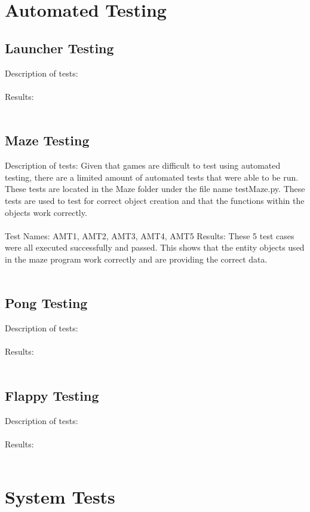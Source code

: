 \documentclass[12pt, titlepage]{article}
\begin{document}
\section{Automated Testing}	

	\subsection{Launcher Testing}
	    Description of tests: \\ \\
		Results: \\ \\
		
	\subsection{Maze Testing}
		Description of tests: Given that games are difficult to test using automated testing, there are a limited amount of automated tests that were able to be run. These tests are located in the Maze folder under the file name testMaze.py. These tests are used to test for correct object creation and that the functions within the objects work correctly. \\ \\
		Test Names: AMT1, AMT2, AMT3, AMT4, AMT5
		Results: These 5 test cases were all executed successfully and passed. This shows that the entity objects used in the maze program work correctly and are providing the correct data.\\ \\
		
	\subsection{Pong Testing}
		Description of tests: \\ \\
		Results: \\ \\
		
	\subsection{Flappy Testing}
		Description of tests: \\ \\
		Results: \\ \\
		
\section{System Tests}
\end{document}
